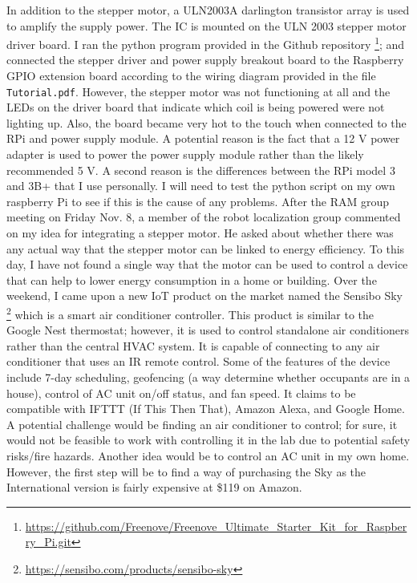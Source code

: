 \documentclass[fontsize=11pt, %
                             paper=letter, %
                             twoside, %
                             captions=tableheading,
                             index=totoc,
                             hyperref]{labbook}
\begin{document}
\begin{addmargin}[0cm]{0cm}
In addition to the stepper motor, a ULN2003A darlington transistor array is used to amplify the supply power. The IC is mounted on the ULN 2003 stepper motor driver board. I ran the python program provided in the Github repository \footnote{\url{https://github.com/Freenove/Freenove_Ultimate_Starter_Kit_for_Raspberry_Pi.git}}; and connected the stepper driver and power supply breakout board to the Raspberry GPIO extension board according to the wiring diagram provided in the file \texttt{Tutorial.pdf}. However, the stepper motor was not functioning at all and the LEDs on the driver board that indicate which coil is being powered were not lighting up. Also, the board became very hot to the touch when connected to the RPi and power supply module. A potential reason is the fact that a 12 V power adapter is used to power the power supply module rather than the likely recommended 5 V. A second reason is the differences between the RPi model 3 and 3B+ that I use personally. I will need to test the python script on my own raspberry Pi to see if this is the cause of any problems. 
After the RAM group meeting on Friday Nov. 8, a member of the robot localization group commented on my idea for integrating a stepper motor. He asked about whether there was any actual way that the stepper motor can be linked to energy efficiency. To this day, I have not found a single way that the motor can be used to control a device that can help to lower energy consumption in a home or building. Over the weekend, I came upon a new IoT product on the market named the Sensibo Sky \footnote{\url{https://sensibo.com/products/sensibo-sky}} which is a smart air conditioner controller. This product is similar to the Google Nest thermostat; however, it is used to control standalone air conditioners rather than the central HVAC system. It is capable of connecting to any air conditioner that uses an IR remote control. Some of the features of the device include 7-day scheduling, geofencing (a way determine whether occupants are in a house), control of AC unit on/off status, and fan speed. It claims to be compatible with IFTTT (If This Then That), Amazon Alexa, and Google Home. A potential challenge would be finding an air conditioner to control; for sure, it would not be feasible to work with controlling it in the lab due to potential safety risks/fire hazards. Another idea would be to control an AC unit in my own home. However, the first step will be to find a way of purchasing the Sky as the International version is fairly expensive at \$119 on Amazon.


\end{addmargin}
\end{document}
